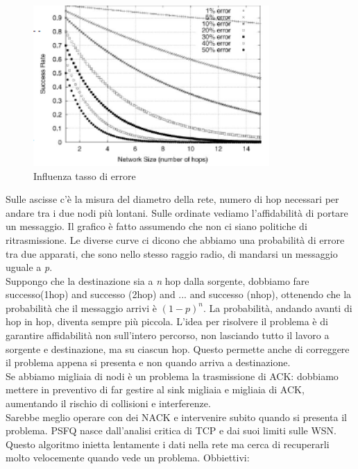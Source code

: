 \documentclass[12pt,italian]{report}
\begin{document}
\begin{figure}[h]
\centering
\includegraphics[width=90mm]{img/grafico.PNG}
\caption{Influenza tasso di errore}
\label{fig:gre}
\end{figure}
Sulle ascisse c'è la misura del diametro della rete, numero di hop necessari per andare tra i due nodi più lontani. Sulle ordinate vediamo l'affidabilità di portare un messaggio. Il grafico è fatto assumendo che non ci siano politiche di ritrasmissione. Le diverse curve ci dicono che abbiamo una probabilità di errore tra due apparati, che sono nello stesso raggio radio, di mandarsi un messaggio uguale a \textit{p}. \\ Suppongo che la destinazione sia a \textit{n} hop dalla sorgente, dobbiamo fare successo(1hop) and successo (2hop) and ... and successo (nhop), ottenendo che la probabilità che il messaggio arrivi è $(1-p)^n$. 
\bigbreak
La probabilità, andando avanti di hop in hop, diventa sempre più piccola. L'idea per risolvere il problema è di garantire affidabilità non sull'intero percorso, non lasciando tutto il lavoro a sorgente e destinazione, ma su ciascun hop. Questo permette anche di correggere il problema appena si presenta e non quando arriva a destinazione. \\ Se abbiamo migliaia di nodi è un problema la trasmissione di ACK: dobbiamo mettere in preventivo di far gestire al sink migliaia e migliaia di ACK, aumentando il rischio di collisioni e interferenze. \\ Sarebbe meglio operare con dei NACK e intervenire subito quando si presenta il problema.
\bigbreak
PSFQ nasce dall'analisi critica di TCP e dai suoi limiti sulle WSN. Questo algoritmo inietta lentamente i dati nella rete ma cerca di recuperarli molto velocemente quando vede un problema. 
\bigbreak
\noindent Obbiettivi:
\end{document}
